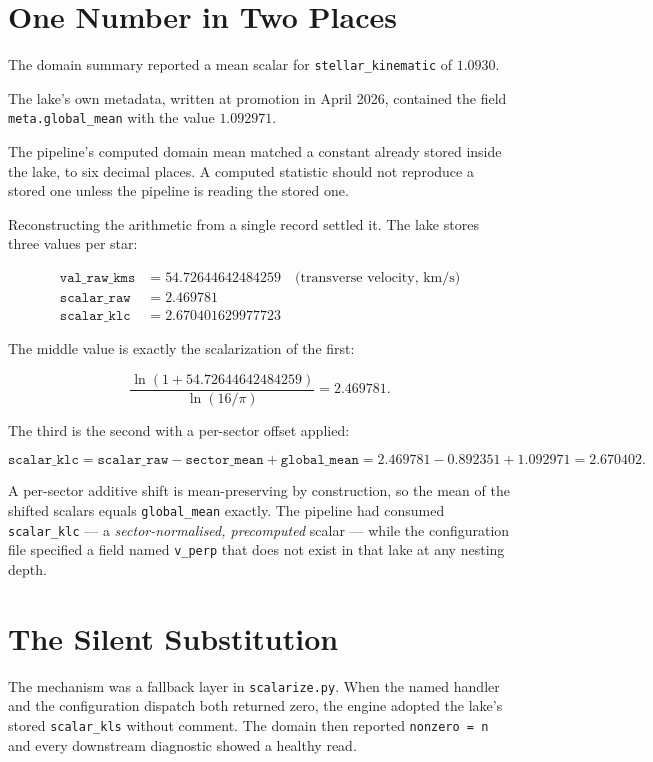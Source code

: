 \documentclass[11pt, letterpaper, openany]{book}
\begin{document}
\section{One Number in Two Places}

The domain summary reported a mean scalar for \texttt{stellar\_kinematic} of $1.0930$.

The lake's own metadata, written at promotion in April 2026, contained the field
\texttt{meta.global\_mean} with the value $1.092971$.

\begin{correctionbox}
The pipeline's computed domain mean matched a constant already stored inside the lake, to six
decimal places. A computed statistic should not reproduce a stored one unless the pipeline is
reading the stored one.
\end{correctionbox}

Reconstructing the arithmetic from a single record settled it. The lake stores three values per
star:

\begin{align}
\texttt{val\_raw\_kms} &= 54.72644642484259 \quad \text{(transverse velocity, km/s)} \\
\texttt{scalar\_raw}   &= 2.469781 \\
\texttt{scalar\_klc}   &= 2.670401629977723
\end{align}

The middle value is exactly the scalarization of the first:

\[
\frac{\ln(1 + 54.72644642484259)}{\ln(16/\pi)} = 2.469781 .
\]

The third is the second with a per-sector offset applied:

\[
\texttt{scalar\_klc} = \texttt{scalar\_raw} - \texttt{sector\_mean} + \texttt{global\_mean}
= 2.469781 - 0.892351 + 1.092971 = 2.670402 .
\]

A per-sector additive shift is mean-preserving by construction, so the mean of the shifted
scalars equals \texttt{global\_mean} exactly. The pipeline had consumed \texttt{scalar\_klc}
--- a \emph{sector-normalised, precomputed} scalar --- while the configuration file specified a
field named \texttt{v\_perp} that does not exist in that lake at any nesting depth.

\section{The Silent Substitution}

The mechanism was a fallback layer in \texttt{scalarize.py}. When the named handler and the
configuration dispatch both returned zero, the engine adopted the lake's stored
\texttt{scalar\_kls} without comment. The domain then reported \texttt{nonzero = n} and every
downstream diagnostic showed a healthy read.
\end{document}
